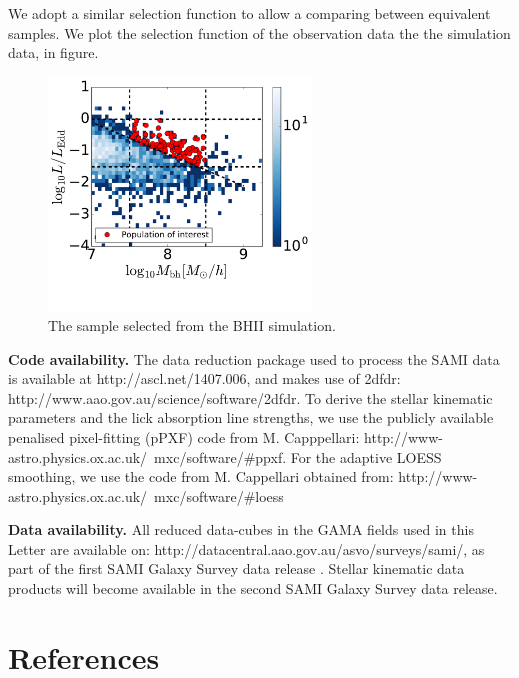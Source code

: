 \documentclass{natureprintstyle}
\begin{document}
We adopt a similar selection function to allow a comparing between equivalent samples. We plot the selection function of the observation data the the simulation data, in figure.
\begin{figure}[t]
\centering
\includegraphics[width = 7cm]{MBII_selectfunc.pdf}
\caption{The sample selected from the BHII simulation.
}
\label{fig:bhII_selectfunc}
\end{figure}

\textbf{Code availability.} The data reduction package used to process the SAMI data is available at http://ascl.net/1407.006, and makes use of 2dfdr: http://www.aao.gov.au/science/software/2dfdr. To derive the stellar kinematic parameters and the lick absorption line strengths, we use the publicly available penalised pixel-fitting (pPXF) code from M. Capppellari: {http://www-astro.physics.ox.ac.uk/~mxc/software/\#ppxf}. For the adaptive LOESS smoothing, we use the code from M. Cappellari obtained from: http://www-astro.physics.ox.ac.uk/~mxc/software/\#loess

\textbf{Data availability.} All reduced data-cubes in the GAMA fields used in this Letter are available on: http://datacentral.aao.gov.au/asvo/surveys/sami/, as part of the first SAMI Galaxy Survey data release \cite{Ding2017a}. Stellar kinematic data products will become available in the second SAMI Galaxy Survey data release. 


\section*{References}
 




\end{document}
